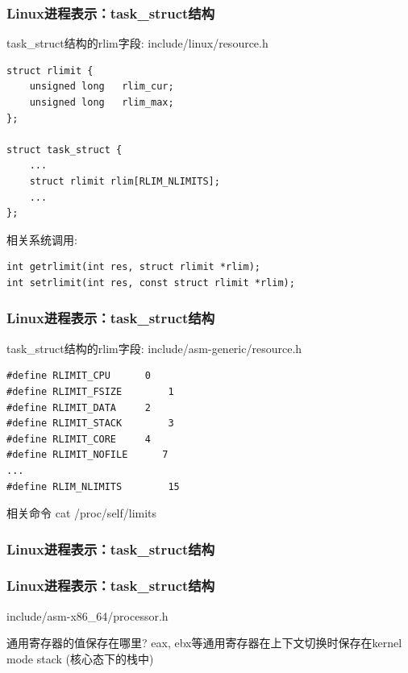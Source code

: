 \documentclass[xcolor=svgnames]{beamer}
\begin{document}
\begin{CJK*}{UTF8}{gbsn}
\begin{frame}[fragile]
\frametitle{Linux进程表示：task\_struct结构}
\begin{block}{task\_struct结构的rlim字段: include/linux/resource.h}
\begin{verbatim}
struct rlimit {
    unsigned long   rlim_cur;
    unsigned long   rlim_max;
};

struct task_struct {
    ...
    struct rlimit rlim[RLIM_NLIMITS];
    ...
};
\end{verbatim}
\end{block}
\begin{block}{相关系统调用:}
\begin{verbatim}
int getrlimit(int res, struct rlimit *rlim);
int setrlimit(int res, const struct rlimit *rlim);
\end{verbatim}
\end{block}
\end{frame}

\begin{frame}[fragile]
\frametitle{Linux进程表示：task\_struct结构}
\begin{block}{task\_struct结构的rlim字段: include/asm-generic/resource.h}
\begin{verbatim}
#define RLIMIT_CPU      0   
#define RLIMIT_FSIZE        1  
#define RLIMIT_DATA     2   
#define RLIMIT_STACK        3 
#define RLIMIT_CORE     4   
#define RLIMIT_NOFILE      7  
...
#define RLIM_NLIMITS        15
\end{verbatim}
\end{block}
\begin{block}{相关命令}
cat /proc/self/limits
\end{block}
\end{frame}

\begin{frame}[fragile]
\frametitle{Linux进程表示：task\_struct结构}
\lstthreadintask
\end{frame}

\begin{frame}[fragile]
\frametitle{Linux进程表示：task\_struct结构}
\begin{block}{include/asm-x86\_64/processor.h}
\lstthreadstruct
\end{block}
\begin{block}{通用寄存器的值保存在哪里?}
\alert{eax}, \alert{ebx}等通用寄存器在上下文切换时保存在kernel mode stack (核心态下的栈中)
\end{block}
\end{frame}


\end{CJK*}
\end{document}
